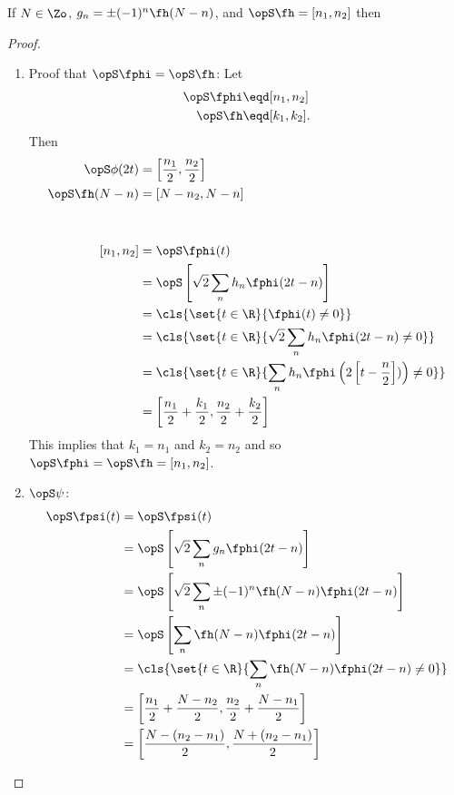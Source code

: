 \begin{theorem}
\label{thm:support}
\formbox{
  \opS\fphi = \opS\fh
}
If $N\in\Zo$, $ g_n  = \pm(-1)^n\fh(N-n)$, and $\opS\fh=[n_1,n_2]$ then
\end{theorem}
\begin{proof}
\begin{enumerate}
\item Proof that $\opS\fphi = \opS\fh$:
Let
\begin{align*}
  \opS\fphi &\eqd [n_1,n_2] \\
  \opS\fh   &\eqd [k_1,k_2].
\end{align*}
Then
\begin{align*}
  \opS\phi(2t) &= \left[ \frac{n_1}{2}, \frac{n_2}{2} \right] \\
  \opS\fh(N-n) &= \left[ N-n_2, N-n \right]  \\
\\
\\
  \left[n_1,n_2\right]
    &= \opS\fphi(t)
  \\&= \opS \left[ \sqrt{2}\sum_n  h_n \fphi(2t-n)\right]
  \\&= \cls{\set{t\in\R}{\fphi(t)\ne 0}}
  \\&= \cls{\set{t\in\R}{\sqrt{2}\sum_n  h_n \fphi(2t-n)\ne 0}}
  \\&= \cls{\set{t\in\R}{\sum_n  h_n \fphi\left(2\left[t-\frac{n}{2}\right])\right)\ne 0}}
  \\&= \left[ \frac{n_1}{2}+\frac{k_1}{2}, \frac{n_2}{2}+\frac{k_2}{2}\right]
\end{align*}
This implies that $k_1=n_1$ and $k_2=n_2$ and so $\opS\fphi = \opS\fh = [n_1,n_2]$.

\item $\opS \psi$:
\begin{align*}
  \opS\fpsi(t)
    &= \opS\fpsi(t)
  \\&= \opS \left[ \sqrt{2}\sum_n  g_n \fphi(2t-n)\right]
  \\&= \opS \left[ \sqrt{2}\sum_n \pm (-1)^n \fh(N-n)\fphi(2t-n)\right]
  \\&= \opS \left[ \sum_n \fh(N-n)\fphi(2t-n)\right]
  \\&= \cls{\set{t\in\R}{\sum_n \fh(N-n)\fphi(2t-n)\ne 0}}
  \\&= \left[ \frac{n_1}{2}+\frac{N-n_2}{2}, \frac{n_2}{2}+\frac{N-n_1}{2}\right]
  \\&= \left[ \frac{N-(n_2-n_1)}{2}, \frac{N+(n_2-n_1)}{2}\right]
\end{align*}
\end{enumerate}
\end{proof}



